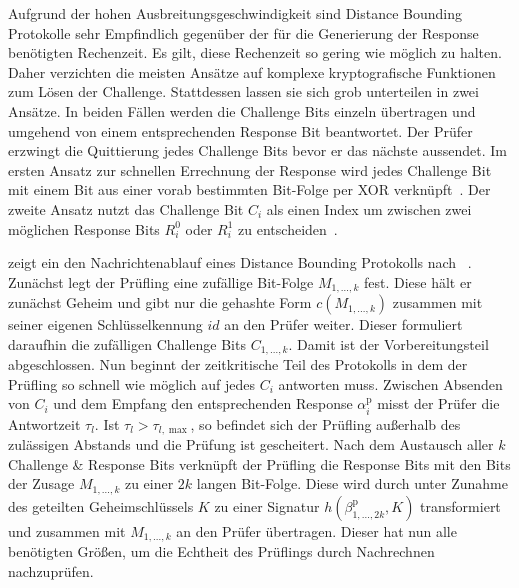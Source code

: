 Aufgrund der hohen Ausbreitungsgeschwindigkeit sind \foreignlanguage{english}{Distance Bounding} Protokolle sehr Empfindlich gegenüber der für die Generierung der \foreignlanguage{english}{Response} benötigten Rechenzeit. Es gilt, diese Rechenzeit so gering wie möglich zu halten. Daher verzichten die meisten Ansätze auf komplexe kryptografische Funktionen zum Lösen der \foreignlanguage{english}{Challenge}. Stattdessen lassen sie sich grob unterteilen in zwei Ansätze. In beiden Fällen werden die \foreignlanguage{english}{Challenge} Bits einzeln übertragen und umgehend von einem entsprechenden \foreignlanguage{english}{Response} Bit beantwortet. Der Prüfer erzwingt die Quittierung jedes \foreignlanguage{english}{Challenge} Bits bevor er das nächste aussendet. Im ersten Ansatz zur schnellen Errechnung der \foreignlanguage{english}{Response} wird jedes \foreignlanguage{english}{Challenge} Bit mit einem Bit aus einer vorab bestimmten Bit-Folge per \foreignlanguage{english}{XOR} verknüpft~\cite{Brands1994}. Der zweite Ansatz nutzt das \foreignlanguage{english}{Challenge} Bit \(C_{i}\) als einen Index um zwischen zwei möglichen \foreignlanguage{english}{Response} Bits \(R_{i}^{0}\) oder \(R_{i}^{1}\) zu entscheiden~\cite{Hancke2005}.

 zeigt ein den Nachrichtenablauf eines \foreignlanguage{english}{Distance Bounding} Protokolls nach \citeauthor{Brands1994}~\cite{Brands1994}. Zunächst legt der Prüfling eine zufällige Bit-Folge \(M_{1, \dots, k}\) fest. Diese hält er zunächst Geheim und gibt nur die gehashte Form \(c(M_{1, \dots, k})\) zusammen mit seiner eigenen Schlüsselkennung \(\mathit{id}\) an den Prüfer weiter. Dieser formuliert daraufhin die zufälligen \foreignlanguage{english}{Challenge} Bits \(C_{1, \dots, k}\). Damit ist der Vorbereitungsteil abgeschlossen. Nun beginnt der zeitkritische Teil des Protokolls in dem der Prüfling so schnell wie möglich auf jedes \(C_{i}\) antworten muss. Zwischen Absenden von \(C_{i}\) und dem Empfang den entsprechenden \foreignlanguage{english}{Response} \(\alpha_{i}^{\mathrm{p}}\) misst der Prüfer die Antwortzeit \(\tau_{l}\). Ist \(\tau_{l} > \tau_{l, \max}\), so befindet sich der Prüfling außerhalb des zulässigen Abstands und die Prüfung ist gescheitert. Nach dem Austausch aller \(k\) \foreignlanguage{english}{Challenge \& Response} Bits verknüpft der Prüfling die \foreignlanguage{english}{Response} Bits mit den Bits der Zusage \(M_{1, \dots, k}\) zu einer \(2k\) langen Bit-Folge. Diese wird durch unter Zunahme des geteilten Geheimschlüssels \(K\) zu einer Signatur \(h(\beta_{1, \dots, 2k}^{\mathrm{p}}, K)\) transformiert und zusammen mit \(M_{1, \dots, k}\) an den Prüfer übertragen. Dieser hat nun alle benötigten Größen, um die Echtheit des Prüflings durch Nachrechnen nachzuprüfen.

